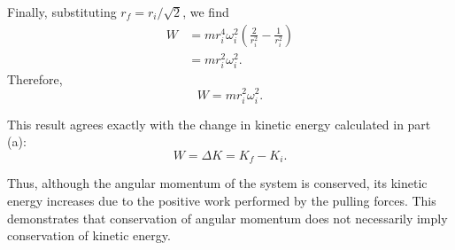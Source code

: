 \documentclass[12pt]{article}
\begin{document}
Finally, substituting $r_f=r_i/\sqrt{2}$, we find
\begin{align}
    W
    &=mr_i^4\omega_i^2
    \left(\frac{2}{r_i^2}-\frac{1}{r_i^2}\right)\\
    &=mr_i^2\omega_i^2.
\end{align}
Therefore,
\begin{equation}
    \boxed{W=mr_i^2\omega_i^2}.
\end{equation}

This result agrees exactly with the change in kinetic energy calculated in part (a):
\begin{equation}
    \boxed{W=\Delta K=K_f-K_i}.
\end{equation}

Thus, although the angular momentum of the system is conserved, its kinetic energy increases due to the positive work performed by the pulling forces. This demonstrates that conservation of angular momentum does not necessarily imply conservation of kinetic energy.
\end{document}
